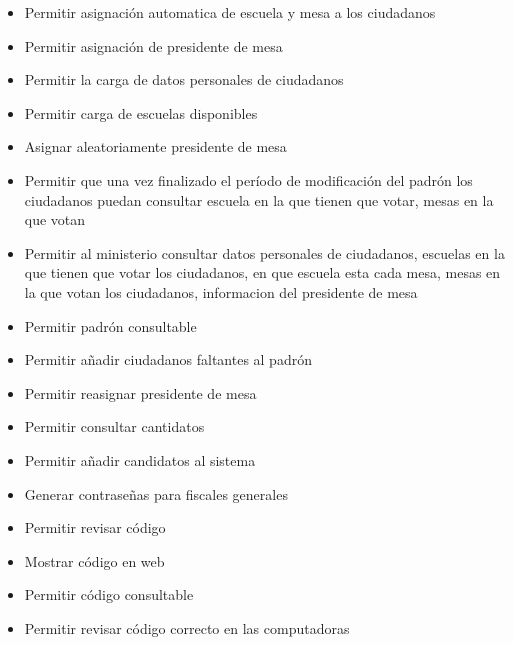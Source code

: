 \begin{itemize}
\item Permitir asignación automatica de escuela y mesa a los ciudadanos
\item Permitir asignación de presidente de mesa
\item Permitir la carga de datos personales de ciudadanos
\item Permitir carga de escuelas disponibles
\item Asignar aleatoriamente presidente de mesa
\item Permitir que una vez finalizado el período de modificación del padrón los ciudadanos puedan consultar escuela en la que tienen que votar, mesas en la que votan
\item Permitir al ministerio consultar datos personales de ciudadanos, escuelas en la que tienen que votar los ciudadanos, en que escuela esta cada mesa, mesas en la que votan los ciudadanos, informacion del presidente de mesa
\item Permitir padrón consultable
\item Permitir añadir ciudadanos faltantes al padrón
\item Permitir reasignar presidente de mesa
\item Permitir consultar cantidatos
\item Permitir añadir candidatos al sistema
\item Generar contraseñas para fiscales generales 
\item Permitir revisar código
\item Mostrar código en web
\item Permitir código consultable
\item Permitir revisar código correcto en las computadoras

\end{itemize}
